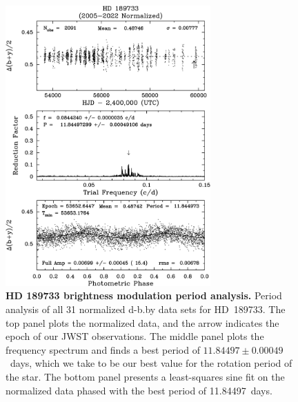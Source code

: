 \documentclass[sn-standardnature]{sn-jnl}%
\begin{document}
\begin{figure}
\centering
  \includegraphics[width=0.7\textwidth,keepaspectratio]{figs/SI_Fig6.png}
  \caption{\textbf{HD 189733 brightness modulation period analysis.} Period analysis of all 31 normalized d-b.by data sets for HD~189733.  The top panel plots the normalized data, and the arrow indicates the epoch of our JWST observations.  The middle panel plots the frequency spectrum and finds a best period of $11.84497\pm0.00049$~days, which we take to be our best value for the rotation period of the star.  The bottom panel presents a least-squares sine fit on the normalized data phased with the best period of 11.84497~days.}
  \label{fig:fig2_APT}
\end{figure}
\end{document}
